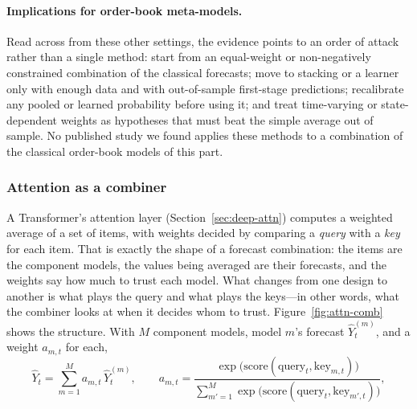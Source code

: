 \paragraph{Implications for order-book meta-models.} Read across from these other settings, the
evidence points to an order of attack rather than a single method: start from an equal-weight or non-negatively constrained combination of
the classical forecasts; move to stacking or a learner only with enough data and with out-of-sample
first-stage predictions; recalibrate any pooled or learned probability before using it; and treat
time-varying or state-dependent weights as hypotheses that must beat the simple average out of sample. No
published study we found applies these methods to a combination of the classical order-book models of
this part.

\subsubsection{Attention as a combiner}
\label{sec:meta-attn}

A Transformer's attention layer (Section~\ref{sec:deep-attn}) computes a weighted average of a set of items, with
weights decided by comparing a \emph{query} with a \emph{key} for each item. That is exactly the shape of a
forecast combination: the items are the component models, the values being averaged are their forecasts, and
the weights say how much to trust each model. What changes from one design to another is what plays the query
and what plays the keys---in other words, what the combiner looks at when it decides whom to trust.
Figure~\ref{fig:attn-comb} shows the structure. With $M$ component models, model $m$'s forecast
$\widehat{Y}^{(m)}_t$, and a weight $a_{m,t}$ for each,
\begin{equation}
\widehat{Y}_t = \sum_{m=1}^{M} a_{m,t}\,\widehat{Y}^{(m)}_t,
\qquad
a_{m,t} = \frac{\exp\bigl(\text{score}(\text{query}_t, \text{key}_{m,t})\bigr)}
               {\sum_{m'=1}^{M}\exp\bigl(\text{score}(\text{query}_t, \text{key}_{m',t})\bigr)},
\label{eq:attn-comb}
\end{equation}

